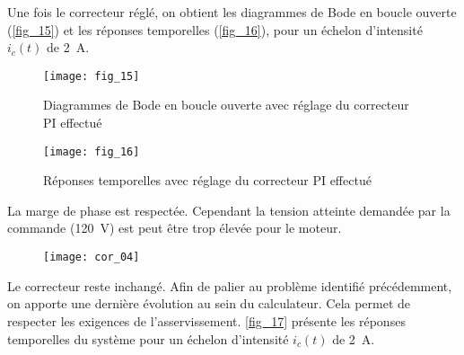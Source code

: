%
%

\ifprof
\else
 Une fois le correcteur réglé, on obtient les diagrammes de Bode en boucle ouverte (\autoref{fig_15}) et les réponses temporelles (\autoref{fig_16}), pour un échelon d’intensité $i_c(t)$ de \SI{2}{A}.
 
 \begin{figure}[H]
\centering
\texttt{[image: fig\_15]}
\caption{Diagrammes de Bode en boucle ouverte avec réglage du correcteur PI effectué \label{fig_15}}
\end{figure}


\begin{figure}[H]
\centering
\texttt{[image: fig\_16]}
\caption{Réponses temporelles avec réglage du correcteur PI effectué \label{fig_16}}
\end{figure}


\fi

\ifprof
\begin{corrige}
La marge de phase est respectée. Cependant la tension atteinte demandée par la commande (\SI{120}{V}) est peut être trop élevée pour le moteur. 
\begin{figure}[H]
\centering
\texttt{[image: cor\_04]}
\end{figure}
\end{corrige}
\else
\fi


Le correcteur reste inchangé. Afin de palier au problème identifié précédemment, on apporte une dernière évolution au sein du calculateur. Cela permet de respecter les exigences de l’asservissement. \autoref{fig_17} présente les réponses temporelles du système pour un échelon d’intensité $i_c(t)$ de \SI{2}{A}.

